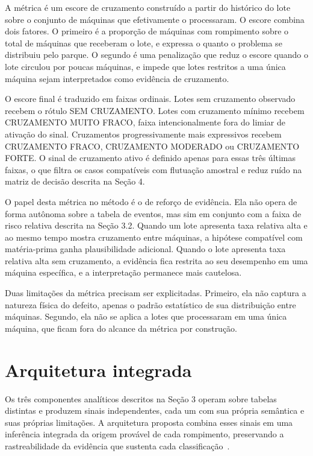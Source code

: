\documentclass[12pt]{article}
\begin{document}
{A métrica é um escore de cruzamento construído a partir do histórico do lote sobre o conjunto de máquinas que efetivamente o processaram. O escore combina dois fatores. O primeiro é a proporção de máquinas com rompimento sobre o total de máquinas que receberam o lote, e expressa o quanto o problema se distribuiu pelo parque. O segundo é uma penalização que reduz o escore quando o lote circulou por poucas máquinas, e impede que lotes restritos a uma única máquina sejam interpretados como evidência de cruzamento.}
%

{O escore final é traduzido em faixas ordinais. Lotes sem cruzamento observado recebem o rótulo \textsc{SEM CRUZAMENTO}. Lotes com cruzamento mínimo recebem \textsc{CRUZAMENTO MUITO FRACO}, faixa intencionalmente fora do limiar de ativação do sinal. Cruzamentos progressivamente mais expressivos recebem \textsc{CRUZAMENTO FRACO}, \textsc{CRUZAMENTO MODERADO} ou \textsc{CRUZAMENTO FORTE}. O sinal de cruzamento ativo é definido apenas para essas três últimas faixas, o que filtra os casos compatíveis com flutuação amostral e reduz ruído na matriz de decisão descrita na Seção 4.}
%

{O papel desta métrica no método é o de reforço de evidência. Ela não opera de forma autônoma sobre a tabela de eventos, mas sim em conjunto com a faixa de risco relativa descrita na Seção 3.2. Quando um lote apresenta taxa relativa alta e ao mesmo tempo mostra cruzamento entre máquinas, a hipótese compatível com matéria-prima ganha plausibilidade adicional. Quando o lote apresenta taxa relativa alta sem cruzamento, a evidência fica restrita ao seu desempenho em uma máquina específica, e a interpretação permanece mais cautelosa.}
%

{Duas limitações da métrica precisam ser explicitadas. Primeiro, ela não captura a natureza física do defeito, apenas o padrão estatístico de sua distribuição entre máquinas. Segundo, ela não se aplica a lotes que processaram em uma única máquina, que ficam fora do alcance da métrica por construção.}
%

\section{Arquitetura integrada}
%
{Os três componentes analíticos descritos na Seção 3 operam sobre tabelas distintas e produzem sinais independentes, cada um com sua própria semântica e suas próprias limitações. A arquitetura proposta combina esses sinais em uma inferência integrada da origem provável de cada rompimento, preservando a rastreabilidade da evidência que sustenta cada classificação~\cite{CALAON2024365}.}
%
\end{document}
